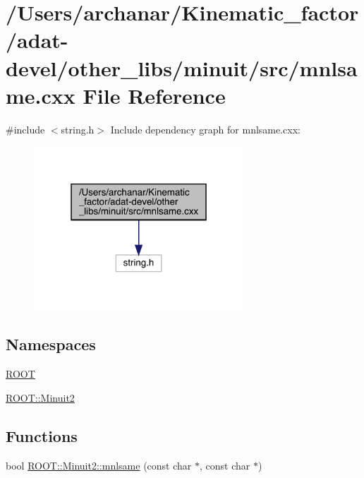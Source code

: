 \hypertarget{adat-devel_2other__libs_2minuit_2src_2mnlsame_8cxx}{}\section{/\+Users/archanar/\+Kinematic\+\_\+factor/adat-\/devel/other\+\_\+libs/minuit/src/mnlsame.cxx File Reference}
\label{adat-devel_2other__libs_2minuit_2src_2mnlsame_8cxx}
{\ttfamily \#include $<$string.\+h$>$}\newline
Include dependency graph for mnlsame.\+cxx\+:
\nopagebreak
\begin{figure}[H]
\begin{center}
\leavevmode
\includegraphics[width=223pt]{d5/da0/adat-devel_2other__libs_2minuit_2src_2mnlsame_8cxx__incl}
\end{center}
\end{figure}
\subsection*{Namespaces}
\begin{DoxyCompactItemize}
\item 
 \mbox{\hyperlink{namespaceROOT}{R\+O\+OT}}
\item 
 \mbox{\hyperlink{namespaceROOT_1_1Minuit2}{R\+O\+O\+T\+::\+Minuit2}}
\end{DoxyCompactItemize}
\subsection*{Functions}
\begin{DoxyCompactItemize}
\item 
bool \mbox{\hyperlink{namespaceROOT_1_1Minuit2_a3f90b826c2c1b4313f9a90c22b8ee657}{R\+O\+O\+T\+::\+Minuit2\+::mnlsame}} (const char $\ast$, const char $\ast$)
\end{DoxyCompactItemize}
